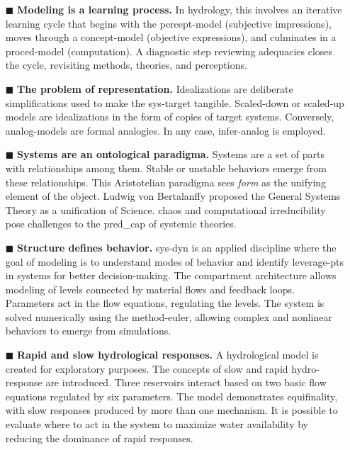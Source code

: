 \documentclass[./main_en.tex]{subfiles}
\begin{document}
\begin{itemize}
    \item[$\blacksquare$] \textbf{Modeling is a learning process.} In \gls{hydrology}, this involves an iterative learning cycle that begins with the \gls{percept-model} (subjective impressions), moves through a \gls{concept-model} (objective expressions), and culminates in a \gls{proced-model} (computation). A diagnostic step reviewing adequacies closes the cycle, revisiting methods, theories, and perceptions.
    
    \item[$\blacksquare$] \textbf{The problem of representation.} Idealizations are deliberate simplifications used to make the \gls{sys-target} tangible. Scaled-down or scaled-up models are idealizations in the form of copies of target systems. Conversely, \gls{analog-models} are formal analogies. In any case, \gls{infer-analog} is employed.
    
    \item[$\blacksquare$] \textbf{Systems are an ontological \gls{paradigma}.} Systems are a set of parts with relationships among them. Stable or unstable behaviors emerge from these relationships. This Aristotelian \gls{paradigma} sees \textit{form} as the unifying element of the object. Ludwig von Bertalanffy proposed the General Systems Theory as a unification of Science. \gls{chaos} and computational irreducibility pose challenges to the \gls{pred_cap} of systemic theories.
    
    \item[$\blacksquare$] \textbf{Structure defines behavior.} \gls{sys-dyn} is an applied discipline where the goal of modeling is to understand modes of behavior and identify \gls{leverage-pts} in systems for better decision-making. The compartment architecture allows modeling of levels connected by material flows and \gls{feedback} loops. Parameters act in the flow equations, regulating the levels. The \gls{system} is solved numerically using the \gls{method-euler}, allowing complex and nonlinear behaviors to emerge from simulations.
    
    \item[$\blacksquare$] \textbf{Rapid and slow hydrological responses.} A hydrological \gls{model} is created for exploratory purposes. The concepts of slow and rapid \gls{hydro-response} are introduced. Three reservoirs interact based on two basic flow equations regulated by six \gls{parameters}. The \gls{model} demonstrates equifinality, with slow responses produced by more than one mechanism. It is possible to evaluate where to act in the \gls{system} to maximize water availability by reducing the dominance of rapid responses.
    

\end{itemize}
\end{document}
